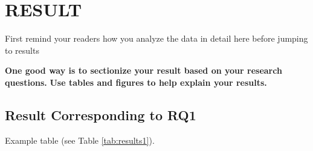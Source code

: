 \setlength{\footskip}{8mm}

\chapter{RESULT}
First remind your readers how you analyze the data in detail here before jumping to results

\textbf{One good way is to sectionize your result based on your research questions.
}
\textbf{Use tables and figures to help explain your results.   
}

\section{Result Corresponding to RQ1}

Example table (see Table \ref{tab:results1}).


